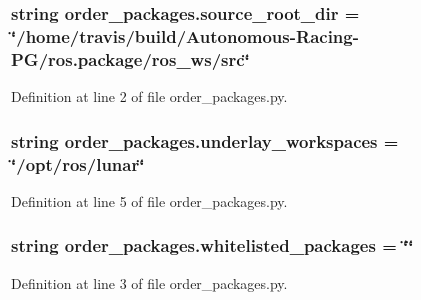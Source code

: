\subsubsection[{\texorpdfstring{source\+\_\+root\+\_\+dir}{source_root_dir}}]{\setlength{\rightskip}{0pt plus 5cm}string order\+\_\+packages.\+source\+\_\+root\+\_\+dir = \char`\"{}/home/travis/build/Autonomous-\/Racing-\/PG/ros.\+package/ros\+\_\+ws/src\char`\"{}}\hypertarget{namespaceorder__packages_aff4fd297841de7fbddc2c0c33a6bab21}{}\label{namespaceorder__packages_aff4fd297841de7fbddc2c0c33a6bab21}


Definition at line 2 of file order\+\_\+packages.\+py.

\subsubsection[{\texorpdfstring{underlay\+\_\+workspaces}{underlay_workspaces}}]{\setlength{\rightskip}{0pt plus 5cm}string order\+\_\+packages.\+underlay\+\_\+workspaces = \char`\"{}/opt/ros/lunar\char`\"{}}\hypertarget{namespaceorder__packages_a11d102ff09fd2977b9075c4c722015d2}{}\label{namespaceorder__packages_a11d102ff09fd2977b9075c4c722015d2}


Definition at line 5 of file order\+\_\+packages.\+py.

\subsubsection[{\texorpdfstring{whitelisted\+\_\+packages}{whitelisted_packages}}]{\setlength{\rightskip}{0pt plus 5cm}string order\+\_\+packages.\+whitelisted\+\_\+packages = \char`\"{}\char`\"{}}\hypertarget{namespaceorder__packages_a84450a73e77dbf3689293b97dcb697a4}{}\label{namespaceorder__packages_a84450a73e77dbf3689293b97dcb697a4}


Definition at line 3 of file order\+\_\+packages.\+py.

